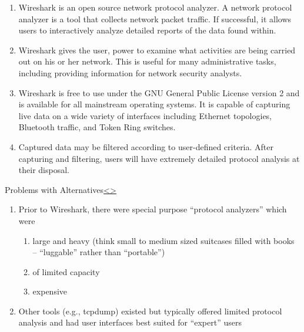 \documentclass[12pt]{extarticle}
\newenvironment{instructionblock}{\Large\bgroup}{\egroup}
\newcommand{\ben}{\begin{enumerate}}
\newcommand{\een}{\end{enumerate}}
\begin{document}
\ben
\item Wireshark\cite{wireshark} is an open source network protocol analyzer. A network protocol analyzer is a tool that collects network packet traffic. If successful, it allows users to interactively analyze detailed reports of the data found within. 

\item Wireshark gives the user, power to examine what activities are being carried out on his or her network. This is useful for many administrative tasks, including providing information for network security analysts. \cite{wireshark} 

\item Wireshark is free to use under the GNU General Public License version 2 and is available for all mainstream operating systems. It is capable of capturing live data on a wide variety of interfaces including Ethernet topologies, Bluetooth traffic, and Token Ring switches. 

\item Captured data may be filtered according to user-defined criteria. After capturing and filtering, users will have extremely detailed protocol analysis at their disposal. \cite{wireshark} 

\een

\pagebreak




\begin{slide}{Problems with Alternatives}{\hyperref[slide 4]{\textless}\hyperref[slide 6]{\textgreater}}
	\begin{instructionblock}
		\ben
			\item Prior to Wireshark, there were special purpose ``protocol analyzers'' which were
			\ben
			\item large and heavy (think small to medium sized suitcases filled with books -- ``luggable'' rather than ``portable'')
			\item of limited capacity
			\item expensive
			\een
			\item Other tools (e.g., tcpdump) existed but typically offered limited protocol analysis and had user interfaces best suited for ``expert'' users
		\een
	\end{instructionblock}
\end{slide}
\vfill
\end{document}
